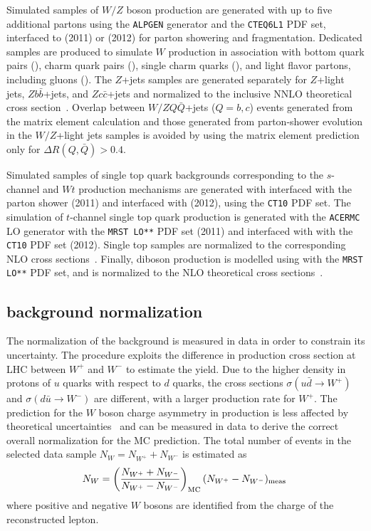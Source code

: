 Simulated samples of $W/Z$ boson production are generated with up to
five additional partons using the {\tt ALPGEN} generator and the
{\tt CTEQ6L1} PDF set, interfaced to \herwig{} (2011) or
\pythia{} (2012) for parton showering and fragmentation. 
Dedicated samples are produced to simulate $W$ production in
association with bottom quark pairs (\wbb{}), charm quark
pairs (\wcc{}), single charm quarks (\wc{}), and light
flavor partons, including gluons (\wlight{}).
The $Z$+jets samples are generated separately for $Z$+light jets,
$Zb\bar{b}$+jets, and $Zc\bar{c}$+jets and normalized to the inclusive
NNLO theoretical cross section~\cite{vjetsxs}.
Overlap between $W/ZQ\bar{Q}$+jets ($Q=b,c$) events generated from the
matrix element calculation and those generated from parton-shower
evolution in the $W/Z$+light jets samples is avoided by using the
matrix element prediction only for $\Delta R(Q,\bar{Q})>0.4$.

Simulated samples of single top quark backgrounds corresponding to the
$s$-channel and $Wt$ production mechanisms are generated with \mcatnlo{}
interfaced with the \herwig{} parton shower (2011) and \powheg{}
interfaced with \pythia{} (2012), using the {\tt CT10} PDF set.
The simulation of $t$-channel single top quark production is
generated with the {\tt ACERMC} LO generator with the {\tt MRST LO**}
PDF set (2011) and \powheg{} interfaced with \pythia{}
with the {\tt CT10} PDF set (2012). Single top samples are normalized
to the corresponding NLO cross sections~\cite{stschan,sttchan,stwt}.
Finally, diboson production is modelled using \herwig{} with
the {\tt MRST LO**} PDF set, and is normalized to the NLO
theoretical cross sections~\cite{dibosonxs}.

\subsection{\wjets{} background normalization}
\label{sec:wjets}

The normalization of the \wjets{} background is measured in data in
order to constrain its uncertainty.
The procedure exploits the difference in production cross section at LHC
between $W^+$ and $W^-$ to estimate the \wjets{} yield.
Due to the higher density in protons of $u$ quarks with respect to $d$ quarks,
the cross sections $\sigma(u\bar{d}\to W^+)$ and $\sigma(d\bar{u}\to
W^-)$ are different, with a larger production rate for $W^+$. The
prediction for the $W$ boson charge asymmetry in \wjets{} production is less
affected by theoretical uncertainties~\cite{wasym} and can be measured
in data to derive the correct overall normalization for the MC prediction.
The total number of \wjets{} events in the selected data sample
$N_{W}=N_{W^+}+N_{W^-}$ is estimated as
\begin{equation}
N_{W} = \left(\frac{N_{W^+}+N_{W^-}}{N_{W^+}-N_{W^-}}\right )_{\rm
  MC}(N_{W^+}-N_{W^-})_{\rm meas}
\phantom{,}
\label{eq:nw}
\end{equation}
where positive and negative $W$ bosons are identified from the
charge of the reconstructed lepton. 

